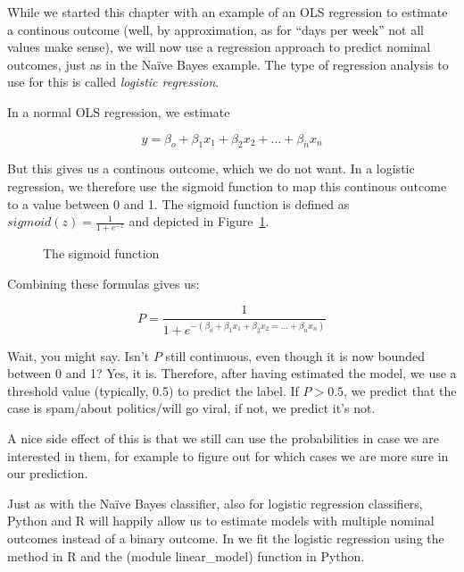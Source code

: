 While we started this chapter with an example of an OLS regression to
estimate a continous outcome (well, by approximation, as for ``days
per week'' not all values make sense), we will now use a regression
approach to predict nominal outcomes, just as in the Na\"ive Bayes
example.  The type of regression analysis to use for this is called
\emph{logistic regression}.

In a normal OLS regression, we estimate

$$y = \beta_o + \beta_1 x_1 + \beta_2 x_2 + \ldots + \beta_n x_n$$

But this gives us a continous outcome, which we do not want. In a
logistic regression, we therefore use the sigmoid function to map this
continous outcome to a value between 0 and 1. The sigmoid function is
defined as $sigmoid(z) = \frac{1}{1 + e^{-z}}$ and depicted in
Figure~\ref{fig:sigmoid}.

\begin{figure}
  \centering
{}
\caption{\label{fig:sigmoid} The sigmoid function}
\end{figure}


Combining these formulas gives us:

$$P = \frac{1}{1 + e^{-(\beta_o + \beta_1 x_1 + \beta_2 x_2 = \ldots + \beta_n x_n)}} $$


Wait, you might say. Isn't $P$ still continuous, even though it is now
bounded between 0 and 1? Yes, it is.  Therefore, after having
estimated the model, we use a threshold value (typically, 0.5) to
predict the label. If $P>0.5$, we predict that the case is spam/about
politics/will go viral, if not, we predict it's not.

A nice side effect of this is that we still can use the probabilities
in case we are interested in them, for example to figure out for which
cases we are more sure in our prediction.

Just as with the Na\"ive Bayes classifier, also for logistic
regression classifiers, Python and R will happily allow us to estimate
models with multiple nominal outcomes instead of a binary outcome. In  we fit the logistic regression using the  method  in R and the  (module linear\_model) function  in Python.

